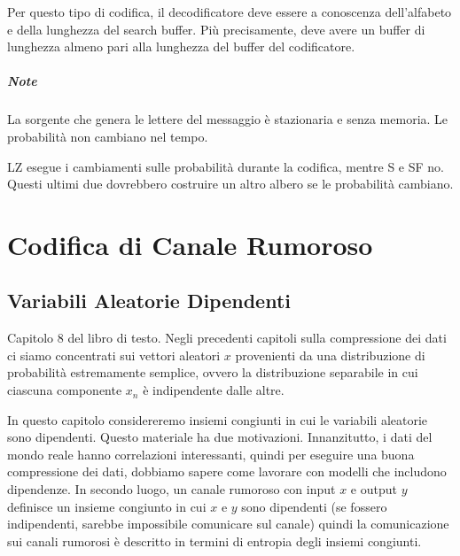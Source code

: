 Per questo tipo di codifica, il decodificatore deve essere a conoscenza dell'alfabeto e della lunghezza del search buffer. Più precisamente, deve avere un buffer di lunghezza almeno pari alla lunghezza del buffer del codificatore.

\paragraph{Note} La sorgente che genera le lettere del messaggio è stazionaria e senza memoria. Le probabilità non cambiano nel tempo. 

LZ esegue i cambiamenti sulle probabilità durante la codifica, mentre S e SF no. Questi ultimi due dovrebbero costruire un altro albero se le probabilità cambiano.




\chapter{Codifica di Canale Rumoroso}

\section{Variabili Aleatorie Dipendenti}
Capitolo 8 del libro di testo. Negli precedenti capitoli sulla compressione dei dati ci siamo concentrati sui vettori aleatori $x$ provenienti da una distribuzione di probabilità estremamente semplice, ovvero la distribuzione separabile in cui ciascuna componente $x_n$ è indipendente dalle altre.

In questo capitolo considereremo insiemi congiunti in cui le variabili aleatorie sono dipendenti. Questo materiale ha due motivazioni. Innanzitutto, i dati del mondo reale hanno correlazioni interessanti, quindi per eseguire una buona compressione dei dati, dobbiamo sapere come lavorare con modelli che includono dipendenze. In secondo luogo, un canale rumoroso con input $x$ e output $y$ definisce un insieme congiunto in cui $x$ e $y$ sono dipendenti (se fossero indipendenti, sarebbe impossibile comunicare sul canale) quindi la comunicazione sui canali rumorosi è descritto in termini di entropia degli insiemi congiunti.

